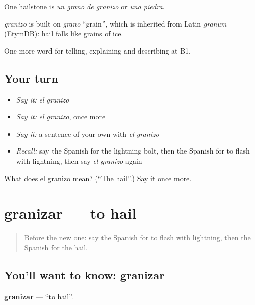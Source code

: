 One hailstone is \emph{un grano de granizo} or \emph{una piedra}.

\begin{cousinweb}
\emph{granizo} is built on \emph{grano} \textquotedblleft{}grain\textquotedblright{}, which is inherited from Latin \emph{grānum} (EtymDB): hail falls like grains of ice.
\end{cousinweb}

\begin{grammarlens}[title={What you've built}]
One more word for telling, explaining and describing at B1.
\end{grammarlens}

\subsection*{Your turn}
\begin{itemize}
\raggedright
  \item \emph{Say it:} \emph{el granizo}
  \item \emph{Say it:} \emph{el granizo}, once more
  \item \emph{Say it:} a sentence of your own with \emph{el granizo}
  \item \emph{Recall:} say the Spanish for the lightning bolt, then the Spanish for to flash with lightning, then say \emph{el granizo} again
\end{itemize}

\begin{tcolorbox}[breakable,colback=teal!4,colframe=teal!35!black,title={Before you move on}]
What does el granizo mean? (\textquotedblleft{}The hail\textquotedblright{}.) Say it once more.
\end{tcolorbox}
\section[granizar]{granizar — to hail}

\label{lesson:ES-C699-granizar}



\begin{quote}
Before the new one: say the Spanish for to flash with lightning, then the Spanish for the hail.
\end{quote}

\subsection*{You'll want to know: granizar}
\textbf{granizar} — \textquotedblleft{}to hail\textquotedblright{}.

